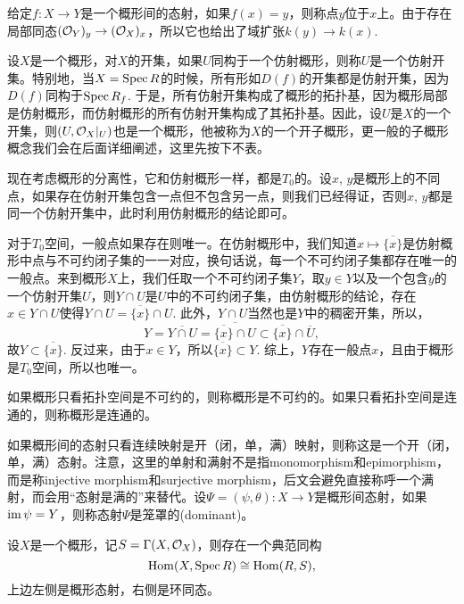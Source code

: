 给定$f:X\to Y$是一个概形间的态射，如果$f(x)=y$，则称点$y$位于$x$上。由于存在局部同态$(\mathcal{O}_Y)_y\to (\mathcal{O}_X)_x$，所以它也给出了域扩张$k(y)\to k(x)$. 

\begin{para}[概形的拓扑]
设$X$是一个概形，对$X$的开集，如果$U$同构于一个仿射概形，则称$U$是一个仿射开集。特别地，当$X=\operatorname{Spec} R$的时候，所有形如$D(f)$的开集都是仿射开集，因为$D(f)$同构于$\operatorname{Spec} R_f$. 于是，所有仿射开集构成了概形的拓扑基，因为概形局部是仿射概形，而仿射概形的所有仿射开集构成了其拓扑基。因此，设$U$是$X$的一个开集，则$(U,\mathcal{O}_X|_U)$也是一个概形，他被称为$X$的一个开子概形，更一般的子概形概念我们会在后面详细阐述，这里先按下不表。

现在考虑概形的分离性，它和仿射概形一样，都是$T_0$的。设$x$, $y$是概形上的不同点，如果存在仿射开集包含一点但不包含另一点，则我们已经得证，否则$x$, $y$都是同一个仿射开集中，此时利用仿射概形的结论即可。

对于$T_0$空间，一般点如果存在则唯一。在仿射概形中，我们知道$x\mapsto \overline{\{x\}}$是仿射概形中点与不可约闭子集的一一对应，换句话说，每一个不可约闭子集都存在唯一的一般点。来到概形$X$上，我们任取一个不可约闭子集$Y$，取$y\in Y$以及一个包含$y$的一个仿射开集$U$，则$Y\cap U$是$U$中的不可约闭子集，由仿射概形的结论，存在$x\in Y\cap U$使得$Y\cap U=\overline{\{x\}}\cap U$. 此外，$Y\cap U$当然也是$Y$中的稠密开集，所以，
\[
	Y=\overline{Y\cap U}=\overline{\overline{\{x\}}\cap U}\subset \overline{\{x\}}\cap \overline{U},
\]
故$Y\subset \overline{\{x\}}$. 反过来，由于$x\in Y$，所以$\overline{\{x\}}\subset Y$. 综上，$Y$存在一般点$x$，且由于概形是$T_0$空间，所以也唯一。

如果概形只看拓扑空间是不可约的，则称概形是不可约的。如果只看拓扑空间是连通的，则称概形是连通的。

如果概形间的态射只看连续映射是开（闭，单，满）映射，则称这是一个开（闭，单，满）态射。注意，这里的单射和满射不是指monomorphism和epimorphism，而是称injective morphism和surjective morphism，后文会避免直接称呼一个满射，而会用“态射是满的”来替代。设$\Psi=(\psi,\theta):X\to Y$是概形间态射，如果$\operatorname{im}\psi = Y$，则称态射$\Psi$是笼罩的(dominant)。
\end{para}

\begin{pro}\label{pro:3.1.3}
设$X$是一个概形，记$S=\Gamma(X,\mathcal{O}_X)$，则存在一个典范同构
\[
	\operatorname{Hom}(X,\operatorname{Spec} R)\cong \operatorname{Hom}(R,S),
\]
上边左侧是概形态射，右侧是环同态。
\end{pro}

